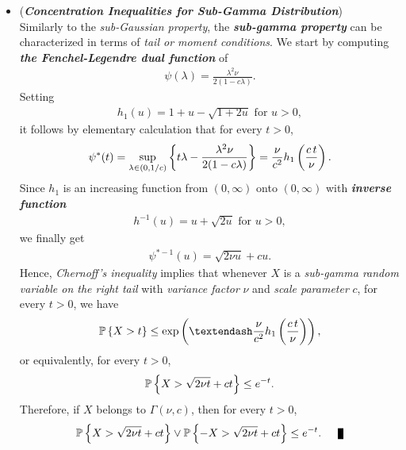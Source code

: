 \documentclass[11pt]{article}
\begin{document}
\begin{itemize}
\item \begin{remark} (\textbf{\emph{Concentration Inequalities for Sub-Gamma Distribution}})\\
Similarly to the \emph{sub-Gaussian property}, the \emph{\textbf{sub-gamma property}} can be characterized in terms of \emph{tail or moment conditions}. We start by computing \emph{\textbf{the Fenchel-Legendre dual function}} of
\begin{align*}
\psi(\lambda) = \frac{\lambda^2 \nu}{2(1 - c\lambda)}.
\end{align*}
Setting
\begin{align*}
h_1(u) = 1 + u - \sqrt{1 + 2u}\text{ for }u > 0,
\end{align*}
it follows by elementary calculation that for every $t > 0$,
\begin{align*}
\psi^{*}(t)  = \sup_{\lambda \in (0, 1/c)}\left\{t\lambda - \frac{\lambda^2 \nu}{2(1 - c\lambda)}\right\} = \frac{\nu}{c^2}h_1\left(\frac{c\,t}{\nu}\right).
\end{align*}
Since $h_1$ is an increasing function from $(0, \infty)$ onto $(0, \infty)$ with \textbf{\emph{inverse function}}
\begin{align*}
h^{-1}(u) = u + \sqrt{2u}\text{ for }u > 0,
\end{align*} we finally get
\begin{align*}
\psi^{*-1}(u) = \sqrt{2\nu u} + c u.
\end{align*}
Hence, \emph{Chernoff's inequality} implies that whenever $X$ is a \emph{sub-gamma random variable on the right tail} with \emph{variance factor} $\nu$ and \textit{scale parameter} $c$, for every $t > 0$, we have
\begin{align}
\bP\set{X > t} \le \exp\paren{– \frac{\nu}{c^2}h_1\paren{\frac{c\,t}{\nu}}}, \label{ineqn: tail_sub_gamma}
\end{align}
or equivalently, for every $t > 0$,
\begin{align}
{\mathbb P}\left\{X > \sqrt{2\nu t}+ c t\right\} \le e^{-t}.
\end{align} Therefore, if $X$ belongs to $\Gamma(\nu, c)$, then for every $t > 0$,
\begin{align*}
\bP\set{X > \sqrt{2\nu t}+ c t} \lor \bP\set{-X > \sqrt{2\nu t}+ c t}  \le e^{-t}. \qed
\end{align*}
\end{remark}
\end{itemize}
\end{document}
